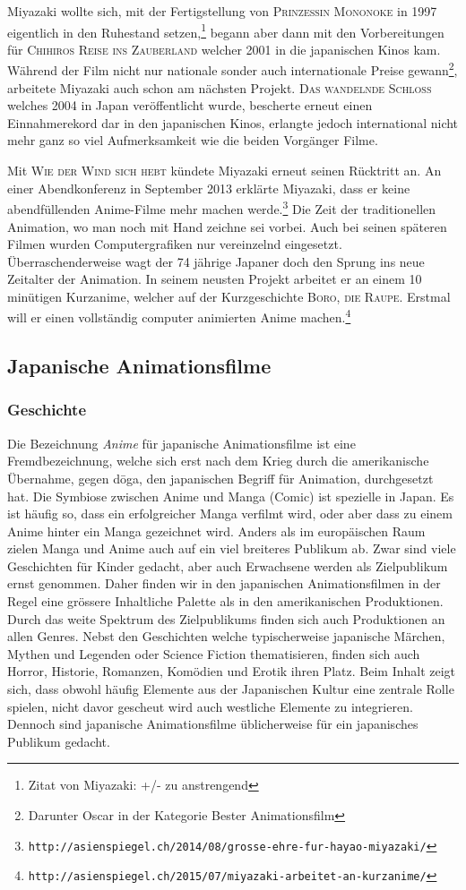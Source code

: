 Miyazaki wollte sich, mit der Fertigstellung von \textsc{Prinzessin Mononoke} in 1997 eigentlich in den Ruhestand setzen,\footnote{Zitat von Miyazaki: +/- zu anstrengend} begann aber dann mit den Vorbereitungen für \textsc{Chihiros Reise ins Zauberland} welcher 2001 in die japanischen Kinos kam. Während der Film nicht nur nationale sonder auch internationale Preise gewann\footnote{Darunter Oscar in der Kategorie Bester Animationsfilm}, arbeitete Miyazaki auch schon am nächsten Projekt. \textsc{Das wandelnde Schloss} welches 2004 in Japan veröffentlicht wurde, bescherte erneut einen Einnahmerekord dar in den japanischen Kinos, erlangte jedoch international nicht mehr ganz so viel Aufmerksamkeit wie die beiden Vorgänger Filme. 

Mit \textsc{Wie der Wind sich hebt} kündete Miyazaki erneut seinen Rücktritt an. An einer Abendkonferenz in September 2013 erklärte Miyazaki, dass er keine abendfüllenden Anime-Filme mehr machen werde.\footnote{\texttt{http://asienspiegel.ch/2014/08/grosse-ehre-fur-hayao-miyazaki/}} Die Zeit der traditionellen Animation, wo man noch mit Hand zeichne sei vorbei. Auch bei seinen späteren Filmen wurden Computergrafiken nur vereinzelnd eingesetzt. Überraschenderweise wagt der 74 jährige Japaner doch den Sprung ins neue Zeitalter der Animation. In seinem neusten Projekt arbeitet er an einem 10 minütigen Kurzanime, welcher auf der Kurzgeschichte \textsc{Boro, die Raupe}. Erstmal will er einen vollständig computer animierten Anime machen.\footnote{\texttt{http://asienspiegel.ch/2015/07/miyazaki-arbeitet-an-kurzanime/}}

\subsection{Japanische Animationsfilme}
\subsubsection{Geschichte}
Die Bezeichnung \emph{Anime} für japanische Animationsfilme ist eine Fremdbezeichnung, welche sich erst nach dem Krieg durch die amerikanische Übernahme, gegen d\={o}ga, den japanischen Begriff für Animation, durchgesetzt hat. Die Symbiose zwischen Anime und Manga (Comic) ist spezielle in Japan. Es ist häufig so, dass ein erfolgreicher Manga verfilmt wird, oder aber dass zu einem Anime hinter ein Manga gezeichnet wird. Anders als im europäischen Raum zielen Manga und Anime auch auf ein viel breiteres Publikum ab. Zwar sind viele Geschichten für Kinder gedacht, aber auch Erwachsene werden als Zielpublikum ernst genommen. Daher finden wir in den japanischen Animationsfilmen in der Regel eine grössere Inhaltliche Palette als in den amerikanischen Produktionen. Durch das weite Spektrum des Zielpublikums finden sich auch Produktionen an allen Genres. Nebst den Geschichten welche typischerweise japanische Märchen, Mythen und Legenden oder Science Fiction thematisieren, finden sich auch Horror, Historie, Romanzen, Komödien und Erotik ihren Platz. Beim Inhalt zeigt sich, dass obwohl häufig Elemente aus der Japanischen Kultur eine zentrale Rolle spielen, nicht davor gescheut wird auch westliche Elemente zu integrieren. Dennoch sind japanische Animationsfilme üblicherweise für ein japanisches Publikum gedacht.

